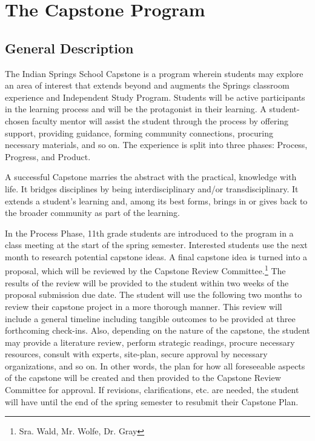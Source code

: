 \section{The Capstone Program}


\subsection{General Description}

The Indian Springs School Capstone is a program wherein students may explore an area of interest that extends beyond and augments the Springs classroom experience and Independent Study Program.  Students will be active participants in the learning process and will be the protagonist in their learning.  A student-chosen faculty mentor will assist the student through the process by offering support, providing guidance, forming community connections, procuring necessary materials, and so on.  The experience is split into three phases:  Process, Progress, and Product.

A successful Capstone marries the abstract with the practical, knowledge with life.  It bridges disciplines by being interdisciplinary and/or transdisciplinary.  It extends a student’s learning and, among its best forms, brings in or gives back to the broader community as part of the learning.



In the Process Phase, 11th grade students are introduced to the program in a class meeting at the start of the spring semester.  Interested students use the next month to research potential capstone ideas.  A final capstone idea is turned into a proposal, which will be reviewed by the Capstone Review Committee.\footnote{Sra. Wald, Mr. Wolfe, Dr. Gray}  The results of the review will be provided to the student within two weeks of the proposal submission due date.  The student will use the following two months to review their capstone project in a more thorough manner.  This review will include a general timeline including tangible outcomes to be provided at three forthcoming check-ins.  Also, depending on the nature of the capstone, the student may provide a literature review, perform strategic readings, procure necessary resources, consult with experts, site-plan, secure approval by necessary organizations, and so on.  In other words, the plan for how all foreseeable aspects of the capstone will be created and then provided to the Capstone Review Committee for approval.  If revisions, clarifications, etc. are needed, the student will have until the end of the spring semester to resubmit their Capstone Plan.

